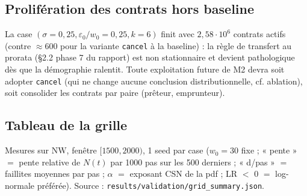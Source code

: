\documentclass[11pt,a4paper]{article}
\newcommand{\NW}{\mathrm{NW}}
\newcommand{\code}[1]{\texttt{#1}}
\begin{document}
\subsection{Prolifération des contrats hors baseline}
La case $(\sigma = 0{,}25, \varepsilon_0/w_0 = 0{,}25, k = 6)$ finit avec
$2{,}58 \cdot 10^6$ contrats actifs (contre $\approx 600$ pour la variante
\code{cancel} à la baseline) : la règle de transfert au prorata (§2.2
phase 7 du rapport) est non stationnaire et devient pathologique dès que la
démographie ralentit. Toute exploitation future de M2 devra soit adopter
\code{cancel} (qui ne change aucune conclusion distributionnelle, cf.
ablation), soit consolider les contrats par paire (prêteur, emprunteur).

\subsection{Tableau de la grille}
Mesures sur $\NW$, fenêtre $[1500, 2000)$, 1 seed par case ($w_0 = 30$
fixe ; « pente » $=$ pente relative de $N(t)$ par 1000 pas sur les 500
derniers ; « d/pas » $=$ faillites moyennes par pas ; $\alpha$ $=$ exposant
CSN de la pdf ; LR $<$ 0 $=$ log-normale préférée). Source :
\code{results/validation/grid\_summary.json}.
\end{document}
